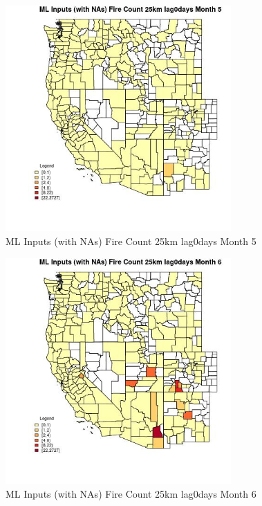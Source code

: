 \begin{figure} 
\centering  
\includegraphics[width=0.77\textwidth]{Code_Outputs/Report_ML_input_PM25_Step4_part_f_de_duplicated_aves_prioritize_24hr_obswNAs_CountyFire_Count_25km_lag0daysmedianMonth5.jpg} 
\caption{\label{fig:Report_ML_input_PM25_Step4_part_f_de_duplicated_aves_prioritize_24hr_obswNAsCountyFire_Count_25km_lag0daysmedianMonth5}ML Inputs (with NAs) Fire Count 25km lag0days Month 5} 
\end{figure} 
 

\begin{figure} 
\centering  
\includegraphics[width=0.77\textwidth]{Code_Outputs/Report_ML_input_PM25_Step4_part_f_de_duplicated_aves_prioritize_24hr_obswNAs_CountyFire_Count_25km_lag0daysmedianMonth6.jpg} 
\caption{\label{fig:Report_ML_input_PM25_Step4_part_f_de_duplicated_aves_prioritize_24hr_obswNAsCountyFire_Count_25km_lag0daysmedianMonth6}ML Inputs (with NAs) Fire Count 25km lag0days Month 6} 
\end{figure} 
 

